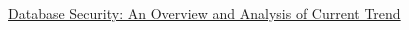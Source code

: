 \documentclass[12pt]{book} %
\begin{document}
\renewcommand\bibname{References} %
\begin{thebibliography}{1}
      \hyperref[sec:db_security_an_overview_and_analysis_of_current_trend_1]{Database Security: An Overview and Analysis of Current Trend} 

   


    
    
    
    
    
  
\end{thebibliography}
  
\end{document}
